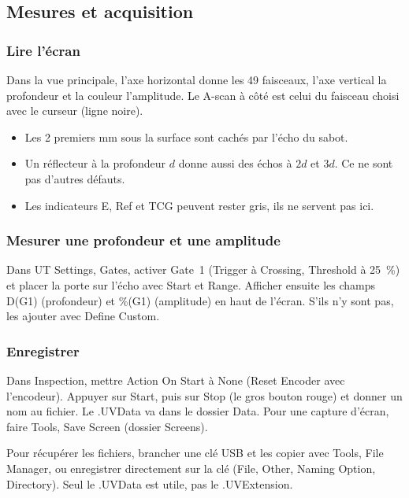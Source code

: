 \documentclass[11pt,letterpaper]{article}
\begin{document}
\subsection{Mesures et acquisition}
\label{sec:mesure}

\subsubsection*{Lire l'\'ecran}

Dans la vue principale, l'axe horizontal donne les 49 faisceaux, l'axe vertical la profondeur et la couleur l'amplitude. Le A-scan \`a c\^ot\'e est celui du faisceau choisi avec le curseur (ligne noire).

\begin{itemize}
  \item Les 2 premiers mm sous la surface sont cach\'es par l'\'echo du sabot.
  \item Un r\'eflecteur \`a la profondeur $d$ donne aussi des \'echos \`a $2d$ et $3d$. Ce ne sont pas d'autres d\'efauts.
  \item Les indicateurs E, Ref et TCG peuvent rester gris, ils ne servent pas ici.
\end{itemize}

\subsubsection*{Mesurer une profondeur et une amplitude}

Dans UT Settings, Gates, activer Gate~1 (Trigger \`a Crossing, Threshold \`a 25~\%) et placer la porte sur l'\'echo avec Start et Range. Afficher ensuite les champs D(G1) (profondeur) et \%(G1) (amplitude) en haut de l'\'ecran. S'ils n'y sont pas, les ajouter avec Define Custom.

\subsubsection*{Enregistrer}

Dans Inspection, mettre Action On Start \`a None (Reset Encoder avec l'encodeur). Appuyer sur Start, puis sur Stop (le gros bouton rouge) et donner un nom au fichier. Le .UVData va dans le dossier Data. Pour une capture d'\'ecran, faire Tools, Save Screen (dossier Screens).

Pour r\'ecup\'erer les fichiers, brancher une cl\'e USB et les copier avec Tools, File Manager, ou enregistrer directement sur la cl\'e (File, Other, Naming Option, Directory). Seul le .UVData est utile, pas le .UVExtension.
\end{document}
